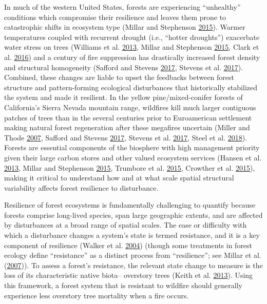 \documentclass[twoside,12pt,final]{ucthesis-CA2012}
\begin{document}
\begin{ucmainmatter}
In much of the western United States, forests are experiencing
``unhealthy'' conditions which compromise their resilience and leaves
them prone to catastrophic shifts in ecosystem type (Millar and
Stephenson \protect\hyperlink{ref-millar2015}{2015}). Warmer
temperatures coupled with recurrent drought (i.e., ``hotter droughts'')
exacerbate water stress on trees (Williams et al.
\protect\hyperlink{ref-parkwilliams2013}{2013}, Millar and Stephenson
\protect\hyperlink{ref-millar2015}{2015}, Clark et al.
\protect\hyperlink{ref-clark2016}{2016}) and a century of fire
suppression has drastically increased forest density and structural
homogeneity (Safford and Stevens
\protect\hyperlink{ref-safford2017}{2017}, Stevens et al.
\protect\hyperlink{ref-stevens2017}{2017}). Combined, these changes are
liable to upset the feedbacks between forest structure and
pattern-forming ecological disturbances that historically stabilized the
system and made it resilient. In the yellow pine/mixed-conifer forests
of California's Sierra Nevada mountain range, wildfires kill much larger
contiguous patches of trees than in the several centuries prior to
Euroamerican settlement making natural forest regeneration after these
megafires uncertain (Miller and Thode
\protect\hyperlink{ref-miller2007}{2007}, Safford and Stevens
\protect\hyperlink{ref-safford2017}{2017}, Stevens et al.
\protect\hyperlink{ref-stevens2017}{2017}, Steel et al.
\protect\hyperlink{ref-steel2018}{2018}). Forests are essential
components of the biosphere with high management priority given their
large carbon stores and other valued ecosystem services (Hansen et al.
\protect\hyperlink{ref-hansen2013}{2013}, Millar and Stephenson
\protect\hyperlink{ref-millar2015}{2015}, Trumbore et al.
\protect\hyperlink{ref-trumbore2015}{2015}, Crowther et al.
\protect\hyperlink{ref-crowther2015}{2015}), making it critical to
understand how and at what scale spatial structural variability affects
forest resilience to disturbance.

Resilience of forest ecosystems is fundamentally challenging to quantify
because forests comprise long-lived species, span large geographic
extents, and are affected by disturbances at a broad range of spatial
scales. The ease or difficulty with which a disturbance changes a
system's state is termed resistance, and it is a key component of
resilience (Walker et al. \protect\hyperlink{ref-walker2004}{2004})
(though some treatments in forest ecology define ``resistance'' as a
distinct process from ``resilience''; see Millar et al.
(\protect\hyperlink{ref-millar2007}{2007})). To assess a forest's
resistance, the relevant state change to measure is the loss of its
characteristic native biota-- overstory trees (Keith et al.
\protect\hyperlink{ref-keith2013}{2013}). Using this framework, a forest
system that is resistant to wildfire should generally experience less
overstory tree mortality when a fire occurs.


\end{ucmainmatter}
\end{document}
